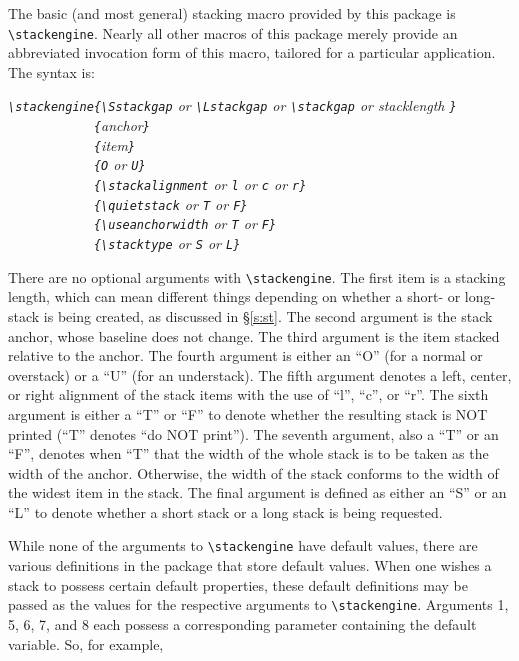 \documentclass{article}
\let\vb\verb
\begin{document}
\begin{sloppypar}
The basic (and most general) stacking macro provided by this package is
\vb|\stackengine|.  Nearly all other macros of this package merely
provide an abbreviated invocation form of this macro, tailored for a
particular application.  The syntax is:
\end{sloppypar}

\itshape
\vb|\stackengine{\Sstackgap| or
  \vb|\Lstackgap| or
  \vb|\stackgap| or stacklength%
  \vb|}|\\
\vb|            {|anchor\vb|}|\\
\vb|            {|item\vb|}|\\
\vb|            {O| or \vb|U}|\\
\vb|            {\stackalignment| or
  \vb|l| or
  \vb|c| or
  \vb|r}|\\
\vb|            {\quietstack| or \vb|T| or \vb|F}|\\
\vb|            {\useanchorwidth| or \vb|T| or \vb|F}|\\
\vb|            {\stacktype| or \vb|S| or \vb|L}|
\upshape

There are no optional arguments with \vb|\stackengine|.  The first
item is a stacking length, which can mean different things depending on
whether a short- or long-stack is being created, as discussed in
\S\ref{s:st}.  The second argument is the stack anchor, whose
baseline does not change.  The third argument is the item stacked
relative to the anchor.  The fourth argument is either an ``O'' (for a
normal or overstack) or a ``U'' (for an understack).  The fifth argument
denotes a left, center, or right alignment of the stack items with the
use of ``l'', ``c'', or ``r''.  The sixth argument is either a ``T'' or
``F'' to denote whether the resulting stack is NOT printed (``T''
denotes ``do NOT print'').  The seventh argument, also a ``T'' or an
``F'', denotes when ``T'' that the width of the whole stack is to be
taken as the width of the anchor.  Otherwise, the width of the stack
conforms to the width of the widest item in the stack.  The final
argument is defined as either an ``S'' or an ``L'' to denote whether a
short stack or a long stack is being requested.

While none of the arguments to \vb|\stackengine| have default values,
there are various definitions in the package that store default values.
When one wishes a stack to possess certain default properties, these
default definitions may be passed as the values for the respective
arguments to \vb|\stackengine|.  Arguments 1, 5, 6, 7, and 8 each
possess a corresponding parameter containing the default variable.  So,
for example,
\end{document}
